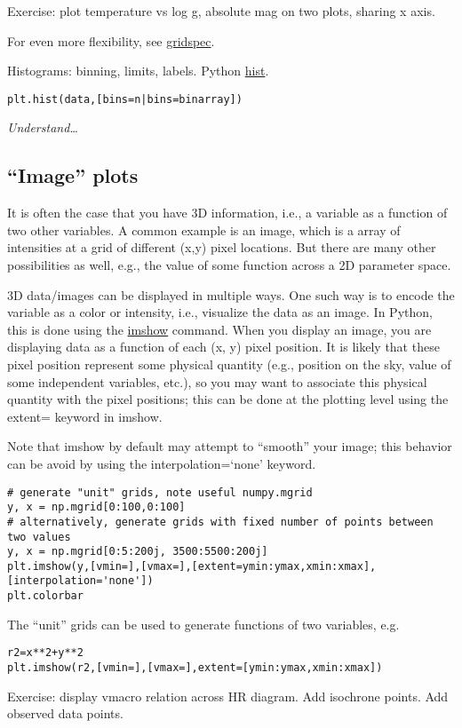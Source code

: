 \documentclass{article}
\newcommand{\test}[1]{%
    \begin{center}
        \colorbox{hl}{\parbox{0.9\textwidth}{\emph{#1}}}
    \end{center}}
\begin{document}
Exercise: plot temperature vs log g, absolute mag on two plots,
sharing x axis.

For even more flexibility, see
\href{http://matplotlib.org/users/gridspec.html}{gridspec}.

Histograms: binning, limits, labels. Python
\href{http://matplotlib.org/api/pyplot_api.html#matplotlib.pyplot.hist}
{hist}.
\begin{verbatim}
plt.hist(data,[bins=n|bins=binarray])
\end{verbatim}

\test{Understand\ldots}

\subsection{``Image'' plots}

It is often the case that you have 3D information, i.e., a variable as
a function of two other variables. A common example is an image, which
is a array of intensities at a grid of different (x,y) pixel
locations. But there are many other possibilities as well, e.g., the
value of some function across a 2D parameter space.

3D data/images can be displayed in multiple ways. One such way is to
encode the variable as a color or intensity, i.e., visualize the data
as an image. In Python, this is done using the
\href{http://matplotlib.org/api/pyplot_api.html#matplotlib.pyplot.imshow}
{imshow} command. When
you display an image, you are displaying data as a function of each
(x, y) pixel position. It is likely that these pixel position
represent some physical quantity (e.g., position on the sky, value of
some independent variables, etc.), so you may want to associate this
physical quantity with the pixel positions; this can be done at the
plotting level using the extent= keyword in imshow.

Note that imshow by default may attempt to ``smooth'' your image; this
behavior can be avoid by using the interpolation=`none' keyword.
\begin{verbatim}
# generate "unit" grids, note useful numpy.mgrid
y, x = np.mgrid[0:100,0:100]
# alternatively, generate grids with fixed number of points between two values
y, x = np.mgrid[0:5:200j, 3500:5500:200j]
plt.imshow(y,[vmin=],[vmax=],[extent=ymin:ymax,xmin:xmax],[interpolation='none'])
plt.colorbar
\end{verbatim}
The ``unit'' grids can be used to generate functions of two variables,
e.g.
\begin{verbatim}
r2=x**2+y**2
plt.imshow(r2,[vmin=],[vmax=],extent=[ymin:ymax,xmin:xmax])
\end{verbatim}
Exercise: display vmacro relation across HR diagram. Add isochrone
points. Add observed data points.
\end{document}
